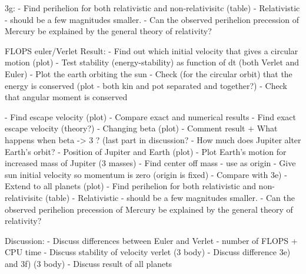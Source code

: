 	3g:
	- 	Find perihelion for both relativistic and non-relativisitc (table)
	- Relativistic - should be a few magnitudes smaller.	
	-  Can the observed perihelion
precession of Mercury be explained by the general theory of relativity?
	
		
	FLOPS euler/Verlet
Result:		
	- Find out which initial velocity that gives a circular motion (plot)
	- Test stability (energy-stability) as function of dt (both Verlet and Euler)
	- Plot the earth orbiting the sun
	- Check (for the circular orbit) that the energy is conserved (plot - both kin and pot separated and together?)
	- Check that angular moment is conserved

	- Find escape velocity (plot)
	 	- Compare exact and numerical results
	- Find exact escape velocity (theory?)
	- Changing beta (plot)
		- Comment result + What happens when beta -> 3 ? (last part in discussion?
	- How much does Jupiter alter Earth's orbit?
	- Position of Jupiter and Earth (plot)	
	- Plot Earth's motion for increased mass of Jupiter (3 masses)
	- Find center off mass - use as origin
	- Give sun initial velocity so momentum is zero (origin is fixed)
	- Compare with 3e)
	- Extend to all planets (plot)
	- Find perihelion for both relativistic and non-relativisitc (table)
	- Relativistic - should be a few magnitudes smaller.	
	-  Can the observed perihelion
precession of Mercury be explained by the general theory of relativity?

Discussion:
	- Discuss differences between Euler and Verlet
		- number of FLOPS + CPU time
	- Discuss stability of velocity verlet (3 body)
	- Discuss difference 3e) and 3f) (3 body)
	- Discuss result of all planets


